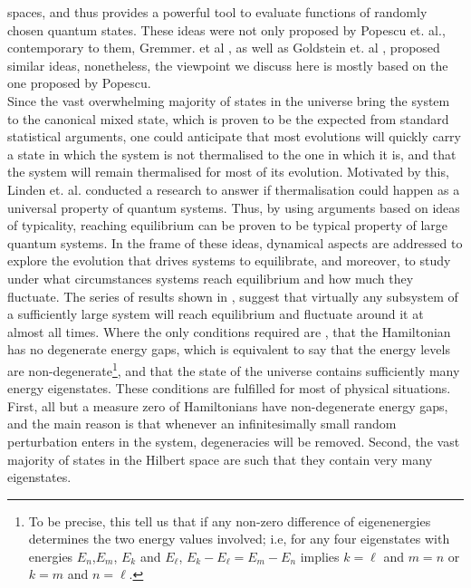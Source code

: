 spaces\cite{popescu_foundations_2005}, and thus provides a powerful tool to evaluate functions of randomly chosen quantum states. These ideas were not only proposed by Popescu et. al., contemporary to them,  Gremmer. et al \cite{gemmer_quantum_2004}, as well as Goldstein et. al \cite{goldstein_canonical_2006}, proposed similar ideas, nonetheless, the viewpoint we discuss here is mostly based on the one proposed by Popescu.\\
 

   
\indent Since the vast overwhelming majority of states in the universe bring the system to the canonical mixed state, which is proven to be the expected from standard statistical arguments, one could anticipate that most evolutions will quickly carry a state in which the system is not thermalised to the one in which it is, and that the system will remain thermalised for most of its evolution. Motivated by this, Linden et. al.\cite{linden_quantum_2009} conducted a research to answer if thermalisation could happen as a universal property of quantum systems. Thus, by using arguments based on ideas of typicality, reaching equilibrium can be proven to be typical property of large quantum systems. In the frame of these ideas, dynamical aspects are addressed to explore the evolution that drives systems to equilibrate, and moreover, to study under what circumstances systems reach equilibrium and how much they fluctuate. The series of results shown in \cite{linden_quantum_2009,linden_speed_2010,malabarba_quantum_2014}, suggest that virtually any subsystem of a sufficiently large system will reach equilibrium and fluctuate around it at almost all times. Where the only conditions required are , that the Hamiltonian has no degenerate energy gaps, which is equivalent to say that the energy levels are non-degenerate\footnote{To be precise, this tell us that if any non-zero difference of eigenenergies determines the two energy values involved; i.e, for any four eigenstates with energies $E_n$,$E_m$, $E_k$ and $E_\ell$, $E_k- E_\ell = E_m - E_n$ implies $k=\ell$ and $m=n$ or $k=m$ and $n=\ell$.}, and that the state of the universe contains sufficiently many energy eigenstates. These conditions are fulfilled for most of physical situations. First, all but a measure zero of Hamiltonians have non-degenerate energy gaps, and the main reason is that whenever an infinitesimally small random perturbation enters in the system, degeneracies will be removed. Second, the vast majority of states in the Hilbert space are such that they contain very many eigenstates.\\



